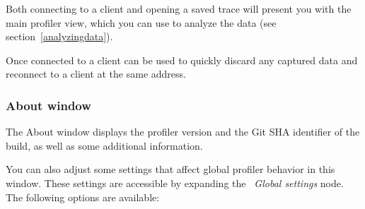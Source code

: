 \documentclass[hidelinks,titlepage,a4paper,twoside]{article}
\begin{document}
Both connecting to a client and opening a saved trace will present you with the main profiler view, which you can use to analyze the data (see section~\ref{analyzingdata}).

Once connected to a client  can be used to quickly discard any captured data and reconnect to a client at the same address.

\subsubsection{About window}
\label{aboutwindow}

The About window displays the profiler version and the Git SHA identifier of the build, as well as some additional information.

You can also adjust some settings that affect global profiler behavior in this window. These settings are accessible by expanding the \emph{\faToolbox{}~Global settings} node. The following options are available:
\end{document}
